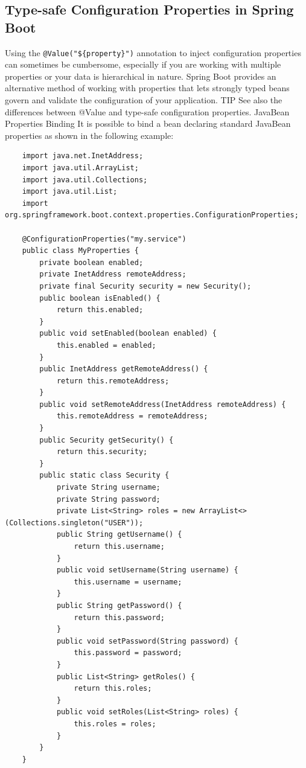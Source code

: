 \documentclass{scrartcl}
\begin{document}
\subsection{Type-safe Configuration Properties in Spring Boot}

Using the \lstinline|@Value("${property}")| annotation to inject configuration properties can sometimes be
cumbersome, especially if you are working with multiple properties or your data is hierarchical in
nature. Spring Boot provides an alternative method of working with properties that lets strongly
typed beans govern and validate the configuration of your application.
TIP
See also the differences between @Value and type-safe configuration properties.
JavaBean Properties Binding
It is possible to bind a bean declaring standard JavaBean properties as shown in the following
example:

\begin{lstlisting}
    import java.net.InetAddress;
    import java.util.ArrayList;
    import java.util.Collections;
    import java.util.List;
    import org.springframework.boot.context.properties.ConfigurationProperties;

    @ConfigurationProperties("my.service")
    public class MyProperties {
        private boolean enabled;
        private InetAddress remoteAddress;
        private final Security security = new Security();
        public boolean isEnabled() {
            return this.enabled;
        }
        public void setEnabled(boolean enabled) {
            this.enabled = enabled;
        }
        public InetAddress getRemoteAddress() {
            return this.remoteAddress;
        }
        public void setRemoteAddress(InetAddress remoteAddress) {
            this.remoteAddress = remoteAddress;
        }
        public Security getSecurity() {
            return this.security;
        }
        public static class Security {
            private String username;
            private String password;
            private List<String> roles = new ArrayList<>(Collections.singleton("USER"));
            public String getUsername() {
                return this.username;
            }
            public void setUsername(String username) {
                this.username = username;
            }
            public String getPassword() {
                return this.password;
            }
            public void setPassword(String password) {
                this.password = password;
            }
            public List<String> getRoles() {
                return this.roles;
            }
            public void setRoles(List<String> roles) {
                this.roles = roles;
            }
        }
    }
\end{lstlisting}
\end{document}

